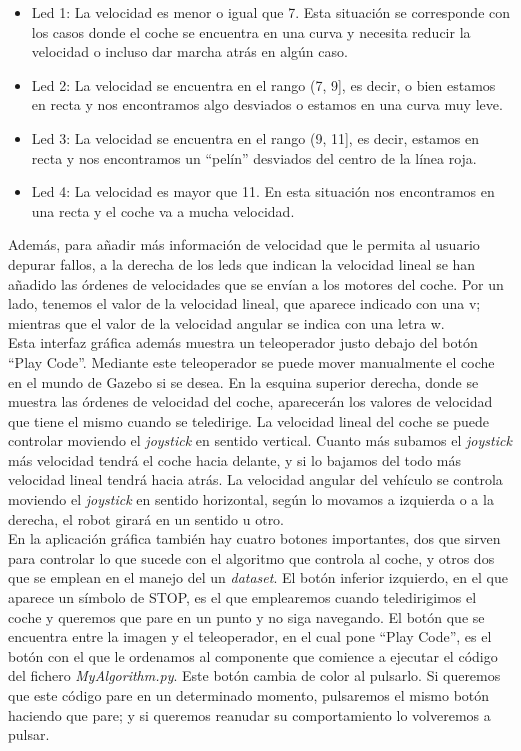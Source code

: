 \begin{itemize}
    \item Led 1: La velocidad es menor o igual que 7. Esta situación se corresponde con los casos donde el coche se encuentra en una curva y necesita reducir la velocidad o incluso dar marcha atrás en algún caso.
    
    \item Led 2: La velocidad se encuentra en el rango (7, 9], es decir, o bien estamos en recta y nos encontramos algo desviados o estamos en una curva muy leve.
    
    \item Led 3: La velocidad se encuentra en el rango (9, 11], es decir, estamos en recta y nos encontramos un ``pelín'' desviados del centro de la línea roja.
    
    \item Led 4: La velocidad es mayor que 11. En esta situación nos encontramos en una recta y el coche va a mucha velocidad.
\end{itemize}


Además, para añadir más información de velocidad que le permita al usuario depurar fallos, a la derecha de los leds que indican la velocidad lineal se han añadido las órdenes de velocidades que se envían a los motores del coche. Por un lado, tenemos el valor de la velocidad lineal, que aparece indicado con una v; mientras que el valor de la velocidad angular se indica con una letra w.\\

Esta interfaz gráfica además muestra un teleoperador justo debajo del botón ``Play Code''. Mediante este teleoperador se puede mover manualmente el coche en el mundo de Gazebo si se desea. En la esquina superior derecha, donde se muestra las órdenes de velocidad del coche, aparecerán los valores de velocidad que tiene el mismo cuando se teledirige. La velocidad lineal del coche se puede controlar moviendo el \textit{joystick} en sentido vertical. Cuanto más subamos el \textit{joystick} más velocidad tendrá el coche hacia delante, y si lo bajamos del todo más velocidad lineal tendrá hacia atrás. La velocidad angular del vehículo se controla moviendo el \textit{joystick} en sentido horizontal, según lo movamos a izquierda o a la derecha, el robot girará en un sentido u otro.\\

En la aplicación gráfica también hay cuatro botones importantes, dos que sirven para controlar lo que  sucede con el algoritmo que controla al coche, y otros dos que se emplean en el manejo del un \textit{dataset}. El botón inferior  izquierdo, en el que aparece un símbolo de STOP, es el que emplearemos cuando teledirigimos el coche y queremos que pare en un punto y no siga navegando. El botón que se encuentra entre la imagen y el teleoperador, en el cual pone ``Play Code'', es el botón con el que le ordenamos al componente que comience a ejecutar el código del fichero \textit{MyAlgorithm.py}. Este botón cambia de color al pulsarlo. Si queremos que este código pare en un determinado momento, pulsaremos el mismo botón haciendo que pare; y si queremos reanudar su comportamiento lo volveremos a pulsar.\\

